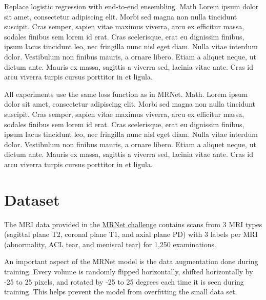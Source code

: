 \documentclass[10pt,twocolumn,letterpaper]{article}
\begin{document}
Replace logistic regression with end-to-end ensembling. Math
Lorem ipsum dolor sit amet, consectetur adipiscing elit. Morbi sed magna non nulla tincidunt suscipit. Cras semper, sapien vitae maximus viverra, arcu ex efficitur massa, sodales finibus sem lorem id erat. Cras scelerisque, erat eu dignissim finibus, ipsum lacus tincidunt leo, nec fringilla nunc nisl eget diam. Nulla vitae interdum dolor. Vestibulum non finibus mauris, a ornare libero. Etiam a aliquet neque, ut dictum ante. Mauris ex massa, sagittis a viverra sed, lacinia vitae ante. Cras id arcu viverra turpis cursus porttitor in et ligula.

All experiments use the same loss function as in MRNet. Math.
Lorem ipsum dolor sit amet, consectetur adipiscing elit. Morbi sed magna non nulla tincidunt suscipit. Cras semper, sapien vitae maximus viverra, arcu ex efficitur massa, sodales finibus sem lorem id erat. Cras scelerisque, erat eu dignissim finibus, ipsum lacus tincidunt leo, nec fringilla nunc nisl eget diam. Nulla vitae interdum dolor. Vestibulum non finibus mauris, a ornare libero. Etiam a aliquet neque, ut dictum ante. Mauris ex massa, sagittis a viverra sed, lacinia vitae ante. Cras id arcu viverra turpis cursus porttitor in et ligula.

\section{Dataset} %

The MRI data provided in the \href{https://stanfordmlgroup.github.io/competitions/mrnet/}{MRNet challenge} contains scans from 3 MRI types (sagittal plane T2, coronal plane T1, and axial plane PD) with 3 labels per MRI (abnormality, ACL tear, and meniscal tear) for 1,250 examinations.


An important aspect of the MRNet model is the data augmentation done during training. Every volume is randomly flipped horizontally, shifted horizontally by -25 to 25 pixels, and rotated by -25 to 25 degrees each time it is seen during training. This helps prevent the model from overfitting the small data set.
\end{document}
